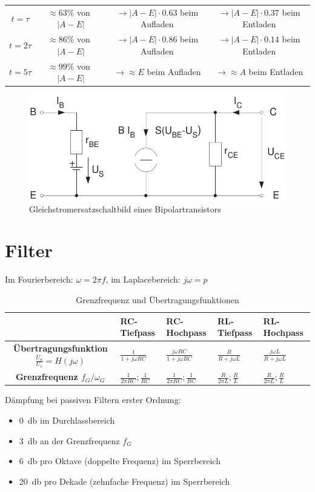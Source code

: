 \documentclass[a5paper, 12pt]{scrartcl}
\begin{document}
\begin{center}
  \begin{tabular}{c|c|c|c}
    \toprule
    \(t=\tau\) & \(\approx 63\%\) von\ \(|A-E|\) & \(\rightarrow |A-E| \cdot 0.63\) beim Aufladen & \(\rightarrow |A-E| \cdot 0.37\) beim Entladen\\
    \(t=2\tau\) & \(\approx 86\%\) von\ \(|A-E|\) & \(\rightarrow |A-E| \cdot 0.86\) beim Aufladen & \(\rightarrow |A-E| \cdot 0.14\) beim Entladen\\
    \(t=5\tau\) & \(\approx 99\%\) von\ \(|A-E|\) & \(\rightarrow \approx E\) beim Aufladen & \(\rightarrow \approx A\) beim Entladen\\
    \bottomrule
  \end{tabular}
\end{center}

\begin{figure}[H]
  \centering
  \includegraphics[width=.6\textwidth]{ESBTransistor}
  \caption{Gleichstromersatzschaltbild eines Bipolartransistors}
\end{figure}

\section{Filter}

Im Fourierbereich: \(\omega = 2 \pi f\), im Laplacebereich: \(j\omega = p\)

\begin{table}[H]
  \centering
  \begin{tabular}{cllll}
    & \textbf{RC-Tiefpass} & \textbf{RC-Hochpass} & \textbf{RL-Tiefpass} & \textbf{RL-Hochpass}\\
    \midrule
    \textbf{Übertragungsfunktion \(\frac{U_a}{U_e} = H(j\omega)\)} & \(\frac{1}{1 + j\omega R C}\) & \(\frac{j\omega RC}{1 + j\omega RC}\) & \(\frac{R}{R + j \omega L}\)& \(\frac{j\omega L}{R + j \omega L}\) \\[1em]
    \textbf{Grenzfrequenz \(f_G / \omega_G\)} & \(\frac{1}{2 \pi R C}; \frac{1}{RC}\) & \(\frac{1}{2 \pi R C}; \frac{1}{RC}\) & \(\frac{R}{2 \pi L}; \frac{R}{L}\) & \(\frac{R}{2 \pi L}; \frac{R}{L}\)
  \end{tabular}
  \caption{Grenzfrequenz und Übertragungsfunktionen}
\end{table}

Dämpfung bei passiven Filtern erster Ordnung:

\begin{itemize}
\item \SI{0}{\decibel} im Durchlassbereich
\item \SI{3}{\decibel} an der Grenzfrequenz \(f_G\)
\item \SI{6}{\decibel} pro Oktave (doppelte Frequenz) im Sperrbereich
\item \SI{20}{\decibel} pro Dekade (zehnfache Frequenz) im Sperrbereich
\end{itemize}
\end{document}
